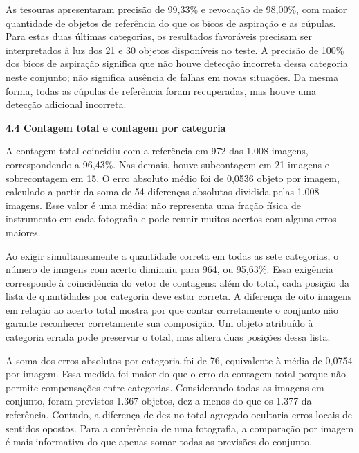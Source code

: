 As tesouras apresentaram precisão de 99,33\% e revocação de 98,00\%, com maior quantidade de objetos de referência do que os bicos de aspiração e as cúpulas. Para estas duas últimas categorias, os resultados favoráveis precisam ser interpretados à luz dos 21 e 30 objetos disponíveis no teste. A precisão de 100\% dos bicos de aspiração significa que não houve detecção incorreta dessa categoria neste conjunto; não significa ausência de falhas em novas situações. Da mesma forma, todas as cúpulas de referência foram recuperadas, mas houve uma detecção adicional incorreta.

\vspace{\baselineskip}
{}
\noindent\textbf{4.4 Contagem total e contagem por categoria}\par
\nobreak\vspace{\baselineskip}\nobreak

A contagem total coincidiu com a referência em 972 das 1.008 imagens, correspondendo a 96,43\%. Nas demais, houve subcontagem em 21 imagens e sobrecontagem em 15. O erro absoluto médio foi de 0,0536 objeto por imagem, calculado a partir da soma de 54 diferenças absolutas dividida pelas 1.008 imagens. Esse valor é uma média: não representa uma fração física de instrumento em cada fotografia e pode reunir muitos acertos com alguns erros maiores.

Ao exigir simultaneamente a quantidade correta em todas as sete categorias, o número de imagens com acerto diminuiu para 964, ou 95,63\%. Essa exigência corresponde à coincidência do vetor de contagens: além do total, cada posição da lista de quantidades por categoria deve estar correta. A diferença de oito imagens em relação ao acerto total mostra por que contar corretamente o conjunto não garante reconhecer corretamente sua composição. Um objeto atribuído à categoria errada pode preservar o total, mas altera duas posições dessa lista.

A soma dos erros absolutos por categoria foi de 76, equivalente à média de 0,0754 por imagem. Essa medida foi maior do que o erro da contagem total porque não permite compensações entre categorias. Considerando todas as imagens em conjunto, foram previstos 1.367 objetos, dez a menos do que os 1.377 da referência. Contudo, a diferença de dez no total agregado ocultaria erros locais de sentidos opostos. Para a conferência de uma fotografia, a comparação por imagem é mais informativa do que apenas somar todas as previsões do conjunto.



